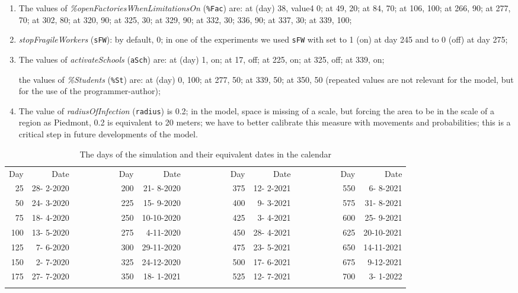 \documentclass[graybox]{svmult}
\begin{document}
\begin{enumerate}[label=\roman*]
\item \label{pp5} The values of \emph{\%openFactoriesWhenLimitationsOn} (\verb|%Fac|) are:
at (day) 38, value4 0; at 49, 20; at 84, 70; at 106, 100; at 266, 90; at 277, 70; at 302, 80; at 320, 90; at 325, 30;
at 329, 90; at 332, 30; 336, 90; at 337, 30; at 339, 100;

\item \label{pp6} \emph{stopFragileWorkers}  (\verb|sFW|): by default, 0; in one of the experiments we used \verb|sFW| with set to 1 (on) at day 245  and to 0 (off) at day 275;

\item \label{pp7} The values of \emph{activateSchools} (\verb|aSch|) are:
at (day) 1, on; at 17, off; at 225, on; at 325, off; at 339, on; 

the values of  \emph{\%Students} (\verb|%St|) are: 
at (day) 0, 100; at 277, 50; at 339, 50; at 350, 50 (repeated values are not relevant for the model, but for the use of the programmer-author);

\item \label{pp8} The value of \emph{radiusOfInfection} (\verb|radius|) is 0.2; in the model, space is missing of a scale, but forcing the area to be in the scale of a region as Piedmont, 0.2 is equivalent to 20 meters; we have to better calibrate this measure with movements and probabilities; this is a critical step in future developments of the model.

\end{enumerate}




\begin{table}[t]
\begin{center}
\begin{footnotesize}
\begin{tabular}{rrrrrrrrrrr}
\hline\noalign{\smallskip}
 Day & Date  &~~~~~~~~& Day & Date &~~~~~~~~& Day & Date &~~~~~~~~& Day & Date \\
 \noalign{\smallskip}\svhline\noalign{\smallskip}
 25 & 28- 2-2020 & & 200 & 21- 8-2020 & & 375 & 12- 2-2021 & & 550 &  6- 8-2021 \\
 50 & 24- 3-2020 & & 225 & 15- 9-2020 & & 400 &  9- 3-2021 & & 575 & 31- 8-2021 \\
 75 & 18- 4-2020 & & 250 & 10-10-2020 & & 425 &  3- 4-2021 & & 600 & 25- 9-2021 \\
100 & 13- 5-2020 & & 275 &  4-11-2020 & & 450 & 28- 4-2021 & & 625 & 20-10-2021 \\
125 &  7- 6-2020 & & 300 & 29-11-2020 & & 475 & 23- 5-2021 & & 650 & 14-11-2021 \\
150 &  2- 7-2020 & & 325 & 24-12-2020 & & 500 & 17- 6-2021 & & 675 &  9-12-2021 \\
175 & 27- 7-2020 & & 350 & 18- 1-2021 & & 525 & 12- 7-2021 & & 700 &  3- 1-2022 \\
\hline\noalign{\smallskip}
\end{tabular}
\end{footnotesize}
\caption{The days of the simulation and their equivalent dates in the calendar}
\label{dates}
\end{center}
\end{table}




\end{document}
